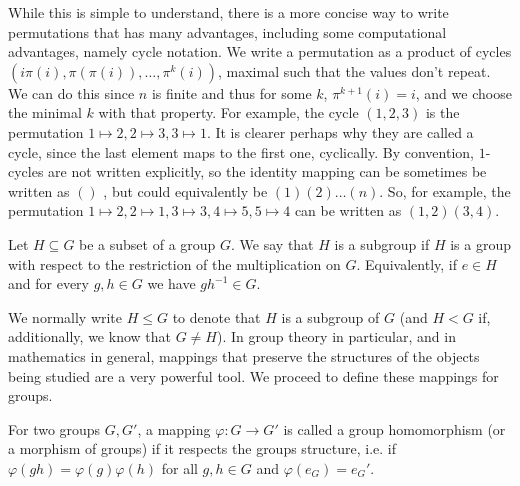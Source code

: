 While this is simple to understand, there is a more concise way to write permutations that has many advantages, including some computational advantages, namely cycle notation.
We write a permutation as a product of cycles $(i \pi(i), \pi(\pi(i)), \ldots, \pi^k(i))$, maximal such that the values don't repeat. We can do this since $n$ is finite and thus for some $k$, $\pi^{k+1}(i)  = i$, and we choose the minimal $k$ with that property.
For example, the cycle $(1,2,3)$ is the permutation $1 \mapsto 2, 2 \mapsto 3, 3 \mapsto 1$. It is clearer perhaps why they are called a cycle, since the last element maps to the first one, cyclically.
By convention, $1$-cycles are not written explicitly, so the identity mapping can be sometimes be written as $()$ , but could equivalently be $(1)(2)\ldots(n)$.
So, for example, the permutation $1 \mapsto 2, 2 \mapsto 1, 3 \mapsto 3, 4 \mapsto 5, 5 \mapsto 4$ can be written as $(1,2)(3,4)$.

\begin{defn}
Let $H \subseteq G$ be a subset of a group $G$.
We say that $H$ is a subgroup if $H$ is a group with respect to the restriction of the multiplication on $G$.
Equivalently, if $e \in H$ and for every $g, h \in G$ we have $g h^{-1} \in G$.
\end{defn}

We normally write $H \leq G$ to denote that $H$ is a subgroup of $G$ (and $H < G$ if, additionally, we know that $G \neq H$).
In group theory in particular, and in mathematics in general, mappings that preserve the structures of the objects being studied are a very powerful tool.
We proceed to define these mappings for groups.

\begin{defn}
For two groups $G, G'$, a mapping $\varphi : G \rightarrow G'$ is called a group homomorphism (or a morphism of groups) if it respects the groups structure, i.e. 
if $\varphi(gh) = \varphi(g) \varphi(h)$ for all $g,h \in G$ and $\varphi(e_G) = e_G'$. 
\end{defn}

